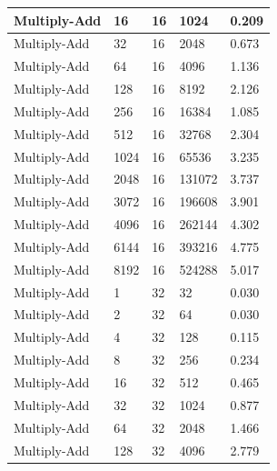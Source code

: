 \documentclass{article}
\begin{document}
\begin{longtable}{|l|l|l|l|l|}
Multiply-Add       & 16   & 16          & 1024              & 0.209             \\ \hline
Multiply-Add       & 32   & 16          & 2048              & 0.673             \\ \hline
Multiply-Add       & 64   & 16          & 4096              & 1.136             \\ \hline
Multiply-Add       & 128  & 16          & 8192              & 2.126             \\ \hline
Multiply-Add       & 256  & 16          & 16384             & 1.085             \\ \hline
Multiply-Add       & 512  & 16          & 32768             & 2.304             \\ \hline
Multiply-Add       & 1024 & 16          & 65536             & 3.235             \\ \hline
Multiply-Add       & 2048 & 16          & 131072            & 3.737             \\ \hline
Multiply-Add       & 3072 & 16          & 196608            & 3.901             \\ \hline
Multiply-Add       & 4096 & 16          & 262144            & 4.302             \\ \hline
Multiply-Add       & 6144 & 16          & 393216            & 4.775             \\ \hline
Multiply-Add       & 8192 & 16          & 524288            & 5.017             \\ \hline
Multiply-Add       & 1    & 32          & 32                & 0.030             \\ \hline
Multiply-Add       & 2    & 32          & 64                & 0.030             \\ \hline
Multiply-Add       & 4    & 32          & 128               & 0.115             \\ \hline
Multiply-Add       & 8    & 32          & 256               & 0.234             \\ \hline
Multiply-Add       & 16   & 32          & 512               & 0.465             \\ \hline
Multiply-Add       & 32   & 32          & 1024              & 0.877             \\ \hline
Multiply-Add       & 64   & 32          & 2048              & 1.466             \\ \hline
Multiply-Add       & 128  & 32          & 4096              & 2.779             \\ \hline

\end{longtable}
\end{document}
